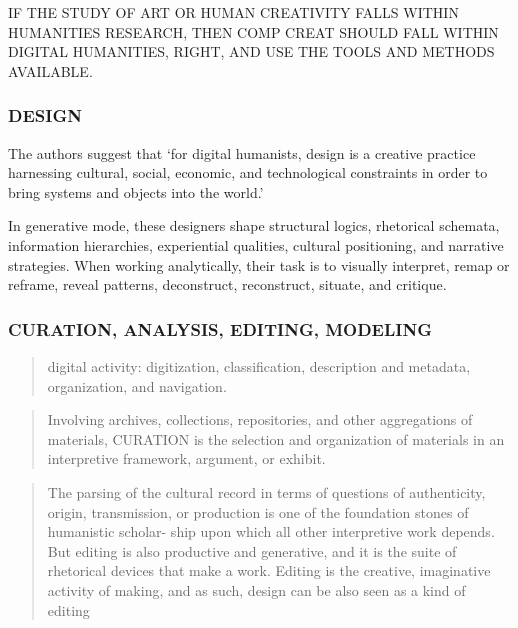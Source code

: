 \begin{draft}
  IF THE STUDY OF ART OR HUMAN CREATIVITY FALLS WITHIN HUMANITIES RESEARCH, THEN COMP CREAT SHOULD FALL WITHIN DIGITAL HUMANITIES, RIGHT, AND USE THE TOOLS AND METHODS AVAILABLE.\@
\end{draft}

\subsubsection*{DESIGN}
The authors suggest that `for digital humanists, design is a creative practice harnessing cultural, social, economic, and technological constraints in order to bring systems and objects into the world.' \autocite[p.13]{Burdick2012}

In generative mode, these designers shape structural logics, rhetorical schemata, information hierarchies, experiential qualities, cultural positioning, and narrative strategies. When working analytically, their task is to visually interpret, remap or reframe, reveal patterns, deconstruct, reconstruct, situate, and critique. \autocite[p.12]{Burdick2012}

\subsubsection*{CURATION, ANALYSIS, EDITING, MODELING}
\begin{quote}
  digital activity: digitization, classification, description and metadata, organization, and navigation. \autocite[p.17]{Burdick2012}
\end{quote}

\begin{quote}
  Involving archives, collections, repositories, and other aggregations of materials, CURATION is the selection and organization of materials in an interpretive framework, argument, or exhibit. \autocite[p.17]{Burdick2012}
\end{quote}

\begin{quote}
  The parsing of the cultural record in terms of questions of authenticity, origin, transmission, or production is one of the foundation stones of humanistic scholar- ship upon which all other interpretive work depends. But editing is also productive and generative, and it is the suite of rhetorical devices that make a work. Editing is the creative, imaginative activity of making, and as such, design can be also seen as a kind of editing \autocite[p.18]{Burdick2012}
\end{quote}

